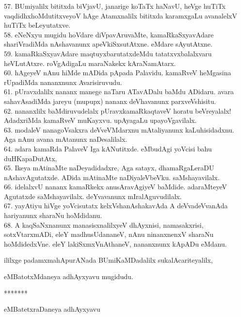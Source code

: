 \documentclass{article}
\begin{document}
57. BUmiyalilx bititxda biVjavU, janarige koTaTx haNavU, heVge huTiTx vaqdidhxhoMdutitxveyoV hAge Atamxnalilx bititxda karamxgaLu avanalelxV huTiTx beLeyutatxve.\\
58. eNeNxyu mugidu hoVdare diVpavAruvaMte, kamaRkaSxyavAdare shariVradiMda nAshavanunx apeVkiSxsutAtxne. eMdare sAyutAtxne.\\
59. kamaRkaSxyavAdare maqtuyxbarutatxdeMdu tatatxvxbalalxvaru heVLutAtxre. roVgAdigaLu maraNakekx kAraNamAtarx.\\
60. hAgeyeV nAnu hiMde mADida pApada Palavidu. kamaRveV heMgasina rUpadiMda nananxnunx Avarisiruvudu.\\
61. pUravxdalilx nananx manege naTaru ATavADalu baMdu ADidaru. avara sahavAsadiMda jareyu (mupupx) nananx deVhavanunx parxveVshisitu.\\
62. nananxlilx baMdiruvudelalx pUravxkamaRkaqtaveV horatu beVreyalalx! AdadxriMda kamaRveV muKayxvu. upAyagaLu upayoVgavilalx.\\
63. modaleV nanagoVsakxra deVveVMdarxnu mAtaliyanunx kaLuhisidadxnu. Aga nAnu avana mAtanunx naDesalilalx.\\
64. adara kamaRda PalaveV Iga kANutitxde. eMbudAgi yoVcisi bahu duHKapaDutAtx,\\
65. Ikeya mAtinaMte naDeyadidadxre, Aga satayx, dhamaRgaLeraDU nAshavAgutatxde. ADida mAtinaMte naDiyaleVbeVku. saMshayavilalx.\\
66. idelalxvU nananx kamaRkekx anusAravAgiyeV baMdide. adaraMteyeV Agutatxde saMshayavilalx. deYvavanunx mIralAguvudilalx.\\
67. yayAtiyu hiVge yoVcisutatx kelxVshanAshakavAda A deVvadeVvanAda hariyanunx sharaNu hoMdidanu.\\
68. A kaqSaNxnanunx manasisxnalilxyeV dhAyxnisi, namasakxrisi, sotxVtarxmADi, eleY madhusUdananeV, nAnu ninanxnenxV sharaNu hoMdidedxVne. eleY lakiSxmxVnAthaneV, nananxnunx kApADu eMdanu.\\

\begin{center}
ililxge padamxmahApurANada BUmiKaMDadalilx sukalAcariteyalilx,
\end{center}

\begin{center}
eMBatotxMdaneya adhAyxyavu mugidudu.
\end{center}

\begin{center}
*******
\end{center}

\begin{center}
eMBatetxraDaneya adhAyxyavu
\end{center}
\end{document}
